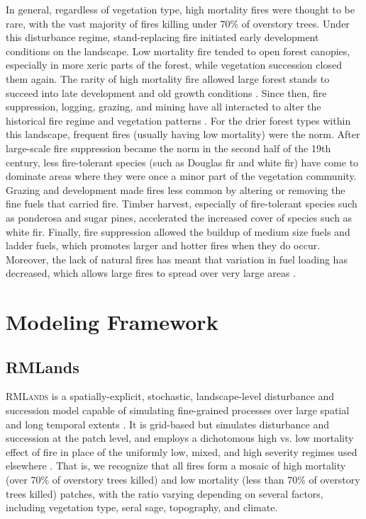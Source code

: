 In general, regardless of vegetation type, high mortality fires were thought to be rare, with the vast majority of fires killing under 70\% of overstory trees. Under this disturbance regime, stand-replacing fire initiated early development conditions on the landscape. Low mortality fire tended to open forest canopies, especially in more xeric parts of the forest, while vegetation succession closed them again. The rarity of high mortality fire allowed large forest stands to succeed into late development and old growth conditions \citep{SNEP1996,Mallek2013,Safford2014,SNEP1996a}. Since then, fire suppression, logging, grazing, and mining have all interacted to alter the historical fire regime and vegetation patterns \citep{Stephens2015,Knapp2013}. For the drier forest types within this landscape, frequent fires (usually having low mortality) were the norm. After large-scale fire suppression became the norm in the second half of the 19th century, less fire-tolerant species (such as Douglas fir and white fir) have come to dominate areas where they were once a minor part of the vegetation community. Grazing and development made fires less common by altering or removing the fine fuels that carried fire. Timber harvest, especially of fire-tolerant species such as ponderosa and sugar pines, accelerated the increased cover of species such as white fir. Finally, fire suppression allowed the buildup of medium size fuels and ladder fuels, which promotes larger and hotter fires when they do occur. Moreover, the lack of natural fires has meant that variation in fuel loading has decreased, which allows large fires to spread over very large areas \citep{Hessburg2005}.

\section{Modeling Framework}
\label{sec:modelframe}

\subsection{RMLands}
\textsc{RMLands} is a spatially-explicit, stochastic, landscape-level disturbance and succession model capable of simulating fine-grained processes over large spatial and long temporal extents \citep{McGarigal2005}. It is grid-based but simulates disturbance and succession at the patch level, and employs a dichotomous high vs. low mortality effect of fire in place of the uniformly low, mixed, and high severity regimes used elsewhere \citep{McGarigal2012}. That is, we recognize that all fires form a mosaic of high mortality (over 70\% of overstory trees killed) and low mortality (less than 70\% of overstory trees killed) patches, with the ratio varying depending on several factors, including vegetation type, seral sage, topography, and climate.

